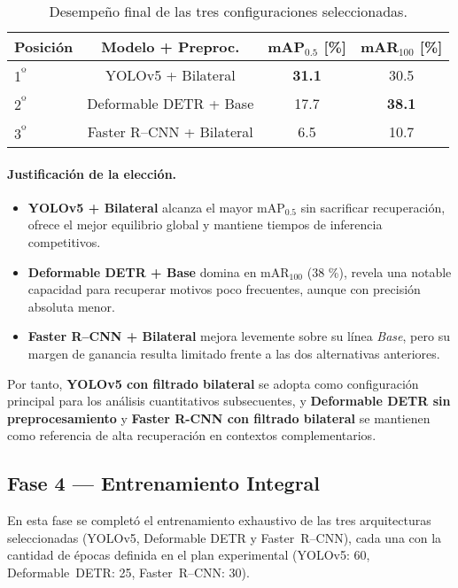 \begin{table}[htpb]
  \centering
  \begin{tabular}{lccc}
    \hline
    \textbf{Posición} & \textbf{Modelo + Preproc.} & \textbf{mAP\(_{0.5}\) [\%]} & \textbf{mAR\(_{100}\) [\%]}\\
    \hline
    1\textsuperscript{º} & YOLOv5 + Bilateral           & \textbf{31.1} & 30.5\\
    2\textsuperscript{º} & Deformable DETR + Base       & 17.7 & \textbf{38.1}\\
    3\textsuperscript{º} & Faster R–CNN + Bilateral     & 6.5  & 10.7\\
    \hline
  \end{tabular}
  \caption[Ranking de configuraciones óptimas]{Desempeño final de las tres configuraciones seleccionadas.}
  \label{tab:fase3_ranking}
\end{table}

\paragraph{Justificación de la elección.}
\begin{itemize}
  \item \textbf{YOLOv5 + Bilateral} alcanza el mayor mAP\(_{0.5}\) sin sacrificar recuperación, ofrece el mejor equilibrio global y mantiene tiempos de inferencia competitivos.
  \item \textbf{Deformable DETR + Base} domina en mAR\(_{100}\) (38 \%), revela una notable capacidad para recuperar motivos poco frecuentes, aunque con precisión absoluta menor.
  \item \textbf{Faster R–CNN + Bilateral} mejora levemente sobre su línea \textit{Base}, pero su margen de ganancia resulta limitado frente a las dos alternativas anteriores.
\end{itemize}

Por tanto, \textbf{YOLOv5 con filtrado bilateral} se adopta como configuración principal para los análisis cuantitativos subsecuentes, y \textbf{Deformable DETR sin preprocesamiento} y \textbf{Faster R-CNN con filtrado bilateral} se mantienen como referencia de alta recuperación en contextos complementarios.

\subsection{Fase 4 — Entrenamiento Integral}
\label{ssec:fase4_integral}

En esta fase se completó el entrenamiento exhaustivo de las tres arquitecturas seleccionadas
(YOLOv5, Deformable DETR y Faster~R–CNN), cada una con la cantidad de épocas definida en el plan experimental
(YOLOv5: 60, Deformable~DETR: 25, Faster~R–CNN: 30).

